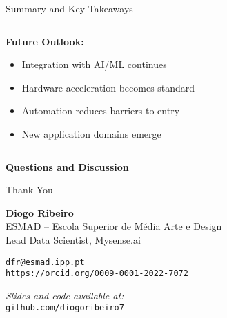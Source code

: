 \documentclass[aspectratio=169,11pt]{beamer}
\begin{document}
\begin{frame}{Summary and Key Takeaways}
\begin{columns}
\begin{column}{0.5\textwidth}
\vspace{0.3cm}
\textbf{Future Outlook:}
\begin{itemize}
\item Integration with AI/ML continues
\item Hardware acceleration becomes standard
\item Automation reduces barriers to entry
\item New application domains emerge
\end{itemize}
\end{column}
\end{columns}

\vspace{0.5cm}
\begin{center}
\textcolor{navyblue}{\textbf{Questions and Discussion}}
\end{center}
\end{frame}

\begin{frame}
\begin{center}
{\Huge Thank You}

\vspace{1cm}

\textbf{Diogo Ribeiro}\\
ESMAD -- Escola Superior de Média Arte e Design\\
Lead Data Scientist, Mysense.ai\\

\vspace{0.5cm}

\texttt{dfr@esmad.ipp.pt}\\
\texttt{https://orcid.org/0009-0001-2022-7072}

\vspace{1cm}

\textit{Slides and code available at:}\\
\texttt{github.com/diogoribeiro7}
\end{center}
\end{frame}
\end{document}
